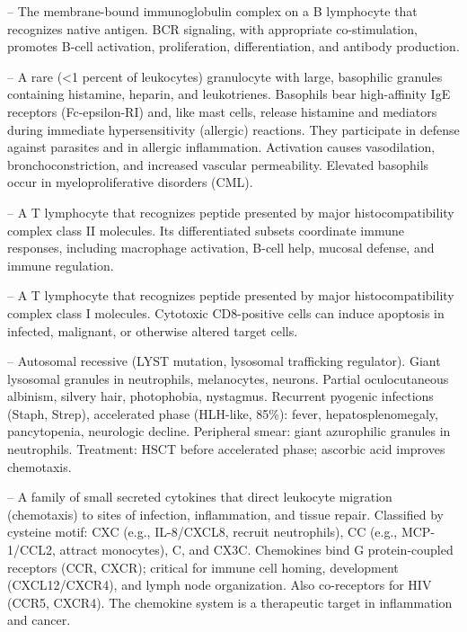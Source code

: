 -- The membrane-bound immunoglobulin complex on a B lymphocyte that recognizes native antigen. BCR signaling, with appropriate co-stimulation, promotes B-cell activation, proliferation, differentiation, and antibody production.

-- A rare (<1 percent of leukocytes) granulocyte with large, basophilic granules containing histamine, heparin, and leukotrienes. Basophils bear high-affinity IgE receptors (Fc-epsilon-RI) and, like mast cells, release histamine and mediators during immediate hypersensitivity (allergic) reactions. They participate in defense against parasites and in allergic inflammation. Activation causes vasodilation, bronchoconstriction, and increased vascular permeability. Elevated basophils occur in myeloproliferative disorders (CML).

-- A T lymphocyte that recognizes peptide presented by major histocompatibility complex class II molecules. Its differentiated subsets coordinate immune responses, including macrophage activation, B-cell help, mucosal defense, and immune regulation.

-- A T lymphocyte that recognizes peptide presented by major histocompatibility complex class I molecules. Cytotoxic CD8-positive cells can induce apoptosis in infected, malignant, or otherwise altered target cells.

-- Autosomal recessive (LYST mutation, lysosomal trafficking regulator). Giant lysosomal granules in neutrophils, melanocytes, neurons. Partial oculocutaneous albinism, silvery hair, photophobia, nystagmus. Recurrent pyogenic infections (Staph, Strep), accelerated phase (HLH-like, 85\%): fever, hepatosplenomegaly, pancytopenia, neurologic decline. Peripheral smear: giant azurophilic granules in neutrophils. Treatment: HSCT before accelerated phase; ascorbic acid improves chemotaxis.

-- A family of small secreted cytokines that direct leukocyte migration (chemotaxis) to sites of infection, inflammation, and tissue repair. Classified by cysteine motif: CXC (e.g., IL-8/CXCL8, recruit neutrophils), CC (e.g., MCP-1/CCL2, attract monocytes), C, and CX3C. Chemokines bind G protein-coupled receptors (CCR, CXCR); critical for immune cell homing, development (CXCL12/CXCR4), and lymph node organization. Also co-receptors for HIV (CCR5, CXCR4). The chemokine system is a therapeutic target in inflammation and cancer.

